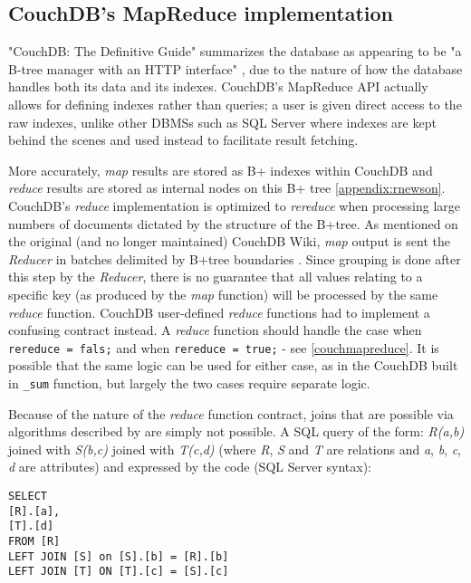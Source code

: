 % 

\subsection{CouchDB's MapReduce implementation}
"CouchDB: The Definitive Guide" summarizes the database as appearing to be "a B-tree manager with an HTTP interface" \cite{couchguide}, due to the nature of how the database handles both its data and its indexes. CouchDB's MapReduce API actually allows for defining indexes rather than queries; a user is given direct access to the raw indexes, unlike other DBMSs such as SQL Server where indexes are kept behind the scenes and used instead to facilitate result fetching.

More accurately, \textit{map} results are stored as B+ indexes within CouchDB and \textit{reduce} results are stored as internal nodes on this B+ tree \ref{appendix:rnewson}. CouchDB's \textit{reduce} implementation is optimized to \textit{rereduce} when processing large numbers of documents dictated by the structure of the B+tree. As mentioned on the original (and no longer maintained) CouchDB Wiki, \textit{map} output is sent the \textit{Reducer} in batches delimited by B+tree boundaries \cite{couchwiki}. Since grouping is done after this step by the \textit{Reducer}, there is no guarantee that all values relating to a specific key (as produced by the \textit{map} function) will be processed by the same \textit{reduce} function. CouchDB user-defined \textit{reduce} functions had to implement a confusing contract instead. A \textit{reduce} function should handle the case when \texttt{rereduce = fals;} and when \texttt{rereduce = true;} - see \ref{couchmapreduce}. It is possible that the same logic can be used for either case, as in the CouchDB built in \texttt{_sum} function, but largely the two cases require separate logic.

Because of the nature of the \textit{reduce} function contract, joins that are possible via algorithms described by \cite{chandar2010} are simply not possible. A SQL query of the form: \textit{R(a,b)} joined with \textit{S(b,c)} joined with \textit{T(c,d)} (where \textit{R}, \textit{S} and \textit{T} are relations and \textit{a}, \textit{b}, \textit{c}, \textit{d} are attributes) and expressed by the code (SQL Server syntax):

\begin{verbatim}
SELECT
[R].[a],
[T].[d]
FROM [R]
LEFT JOIN [S] on [S].[b] = [R].[b]
LEFT JOIN [T] ON [T].[c] = [S].[c]
\end{verbatim}

